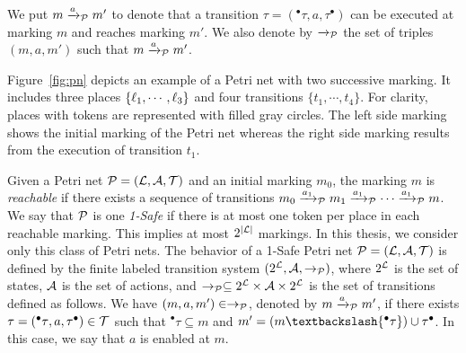 We put $m\xrightarrow{a}_{\mathcal{P}}m'$ to denote that a transition $\tau=({^\bullet\tau},a,
  \tau^\bullet)$ can be executed at marking $m$ and reaches marking $m'$. 
  We also denote by $\xrightarrow{}_{\mathcal{P}}$
the set of triples $(m,a,m')$ such that $m\xrightarrow{a}_{\mathcal{P}}m'$.
  
\begin{example}
  Figure~\ref{fig:pn} depicts an example of a Petri net with two successive marking. It includes
  three places $\{\ell_1,\cdots,\ell_3\}$ and four transitions $\{t_1,\cdots,t_4\}$. For clarity,
  places with tokens are represented with filled gray circles. The left side marking 
  shows the initial marking of the Petri net whereas the right side marking results from the
  execution of transition $t_1$.
\end{example}

Given a Petri net $\mathcal{P}=(\mathcal{L},\mathcal{A},\mathcal{T})$ and an initial marking $m_0$, the marking $m$
is \emph{reachable} if there exists a sequence of transitions $m_0\xrightarrow{a_1}_{\mathcal{P}}m_1
\xrightarrow{a_1}_{\mathcal{P}}\cdots\xrightarrow{a_1}_{\mathcal{P}}m$. We say that $\mathcal{P}$ is one \emph{1-Safe}
if there is at most one token per place in each reachable marking. This implies at most
$2^{|\mathcal{L}|}$ markings. In this thesis, we consider only this class of Petri nets.
The behavior of a 1-Safe Petri net  $\mathcal{P}=(\mathcal{L},\mathcal{A},\mathcal{T})$ is defined by the finite
labeled transition system $(2^{\mathcal{L}},\mathcal{A},\to_{\mathcal{P}})$, where $2^{\mathcal{L}}$ is the set of
states, $\mathcal{A}$ is the set of actions, and $\to_{\mathcal{P}}\subseteq 2^{\mathcal{L}}\times\mathcal{A}\times
2^{\mathcal{L}}$ is the set of transitions defined as follows. We have $(m,a,m')\in\to_{\mathcal{P}}$, 
denoted by $m\xrightarrow{a}_{\mathcal{P}}m'$, if there exists $\tau=({^\bullet\tau},a,{\tau^\bullet })
  \in\mathcal{T}$ such that ${^\bullet\tau}\subseteq m$ and $m'=(m\textbackslash{^\bullet\tau})
  \cup{\tau^\bullet }$.
In this case, we say that $a$ is enabled at $m$.


